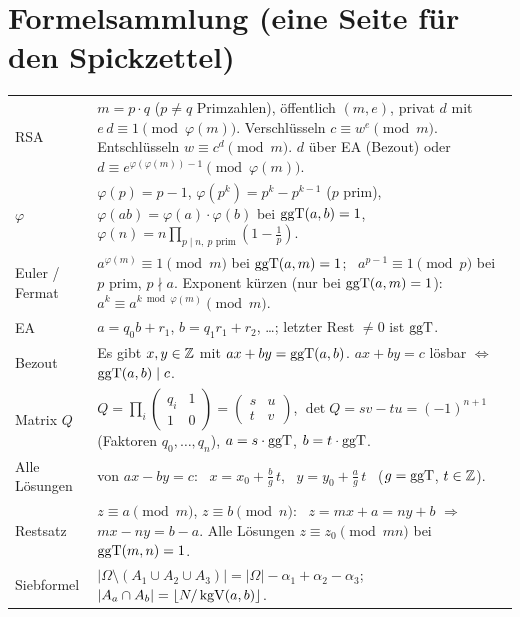 \section{Formelsammlung (eine Seite für den Spickzettel)}
\noindent\begin{tabular}{@{}>{\raggedright\arraybackslash}p{3.2cm}>{\raggedright\arraybackslash}p{\dimexpr\linewidth-3.2cm-2\tabcolsep\relax}@{}}
\toprule
RSA & $m = p \cdot q$ ($p \ne q$ Primzahlen), öffentlich $(m, e)$, privat $d$ mit $e\,d \equiv 1 \pmod{\varphi(m)}$.
Verschlüsseln $c \equiv w^e \pmod m$. Entschlüsseln $w \equiv c^d \pmod m$.
$d$ über EA (Bezout) oder $d \equiv e^{\varphi(\varphi(m)) - 1} \pmod{\varphi(m)}$.\\
$\varphi$ & $\varphi(p) = p - 1$, $\varphi(p^k) = p^k - p^{k-1}$ ($p$ prim), $\varphi(ab) = \varphi(a) \cdot \varphi(b)$ bei $\operatorname{ggT}(a,b) = 1$,
$\varphi(n) = n \prod_{p \mid n,\ p \text{ prim}} (1 - \frac1p)$.\\
Euler / Fermat & $a^{\varphi(m)} \equiv 1 \pmod m$ bei $\operatorname{ggT}(a, m) = 1$; \ $a^{p-1} \equiv 1 \pmod p$ bei $p$ prim, $p \nmid a$.
Exponent kürzen (nur bei $\operatorname{ggT}(a, m) = 1$): $a^k \equiv a^{k \bmod \varphi(m)} \pmod m$.\\
EA & $a = q_0 b + r_1$, $b = q_1 r_1 + r_2$, \dots; letzter Rest $\neq 0$ ist $\operatorname{ggT}$.\\
Bezout & Es gibt $x, y \in \mathbb{Z}$ mit $ax + by = \operatorname{ggT}(a,b)$. $ax + by = c$ lösbar $\Leftrightarrow$ $\operatorname{ggT}(a,b) \mid c$.\\
Matrix $Q$ & $Q = \prod_i \begin{pmatrix} q_i & 1\\ 1 & 0 \end{pmatrix} = \begin{pmatrix} s & u\\ t & v\end{pmatrix}$,
$\det Q = sv - tu = (-1)^{n+1}$ (Faktoren $q_0, \dots, q_n$), $a = s \cdot \operatorname{ggT}$, $b = t \cdot \operatorname{ggT}$.\\
Alle Lösungen & von $ax - by = c$: \ $x = x_0 + \frac{b}{g}\,t$, \ $y = y_0 + \frac{a}{g}\,t$ \ ($g = \operatorname{ggT}$, $t \in \mathbb{Z}$).\\
Restsatz & $z \equiv a \pmod m$, $z \equiv b \pmod n$: \ $z = mx + a = ny + b$ $\Rightarrow$ $mx - ny = b - a$.
Alle Lösungen $z \equiv z_0 \pmod{mn}$ bei $\operatorname{ggT}(m,n) = 1$.\\
Siebformel & $|\Omega \setminus (A_1 \cup A_2 \cup A_3)| = |\Omega| - \alpha_1 + \alpha_2 - \alpha_3$;
$|A_a \cap A_b| = \lfloor N / \operatorname{kgV}(a,b) \rfloor$.\\

\end{tabular}
